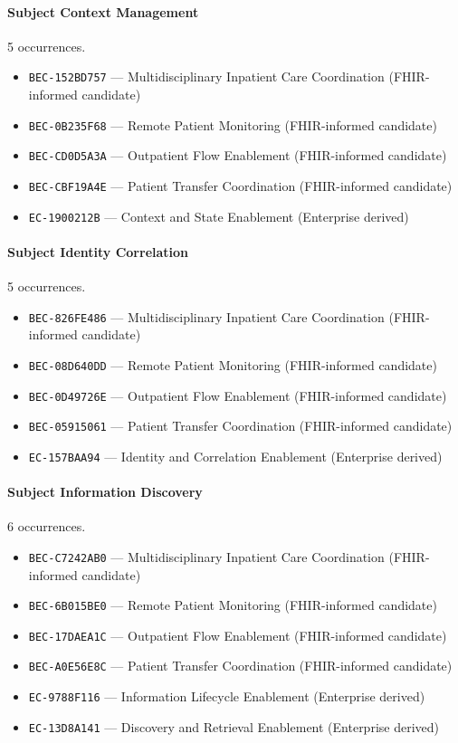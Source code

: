 \documentclass[11pt,a4paper,openany]{book}
\begin{document}
\paragraph{Subject Context Management} 5 occurrences.\par
\begin{itemize}
\item \texttt{BEC-152BD757} --- Multidisciplinary Inpatient Care Coordination (FHIR-informed candidate)
\item \texttt{BEC-0B235F68} --- Remote Patient Monitoring (FHIR-informed candidate)
\item \texttt{BEC-CD0D5A3A} --- Outpatient Flow Enablement (FHIR-informed candidate)
\item \texttt{BEC-CBF19A4E} --- Patient Transfer Coordination (FHIR-informed candidate)
\item \texttt{EC-1900212B} --- Context and State Enablement (Enterprise derived)
\end{itemize}
\paragraph{Subject Identity Correlation} 5 occurrences.\par
\begin{itemize}
\item \texttt{BEC-826FE486} --- Multidisciplinary Inpatient Care Coordination (FHIR-informed candidate)
\item \texttt{BEC-08D640DD} --- Remote Patient Monitoring (FHIR-informed candidate)
\item \texttt{BEC-0D49726E} --- Outpatient Flow Enablement (FHIR-informed candidate)
\item \texttt{BEC-05915061} --- Patient Transfer Coordination (FHIR-informed candidate)
\item \texttt{EC-157BAA94} --- Identity and Correlation Enablement (Enterprise derived)
\end{itemize}
\paragraph{Subject Information Discovery} 6 occurrences.\par
\begin{itemize}
\item \texttt{BEC-C7242AB0} --- Multidisciplinary Inpatient Care Coordination (FHIR-informed candidate)
\item \texttt{BEC-6B015BE0} --- Remote Patient Monitoring (FHIR-informed candidate)
\item \texttt{BEC-17DAEA1C} --- Outpatient Flow Enablement (FHIR-informed candidate)
\item \texttt{BEC-A0E56E8C} --- Patient Transfer Coordination (FHIR-informed candidate)
\item \texttt{EC-9788F116} --- Information Lifecycle Enablement (Enterprise derived)
\item \texttt{EC-13D8A141} --- Discovery and Retrieval Enablement (Enterprise derived)
\end{itemize}
\end{document}
